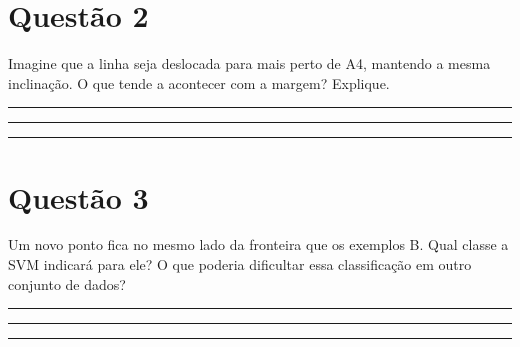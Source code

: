 \documentclass[12pt,a4paper]{article}
\newcommand{\linha}{\rule{\linewidth}{0.35pt}}
\begin{document}
\section*{Questão 2}

Imagine que a linha seja deslocada para mais perto de A4, mantendo a mesma inclinação. O que tende a acontecer com a margem? Explique.

\vspace{0.25em}
\linha\par\vspace{0.5em}
\linha\par\vspace{0.5em}
\linha

\section*{Questão 3}

Um novo ponto fica no mesmo lado da fronteira que os exemplos B. Qual classe a SVM indicará para ele? O que poderia dificultar essa classificação em outro conjunto de dados?

\vspace{0.25em}
\linha\par\vspace{0.5em}
\linha\par\vspace{0.5em}
\linha
\end{document}

